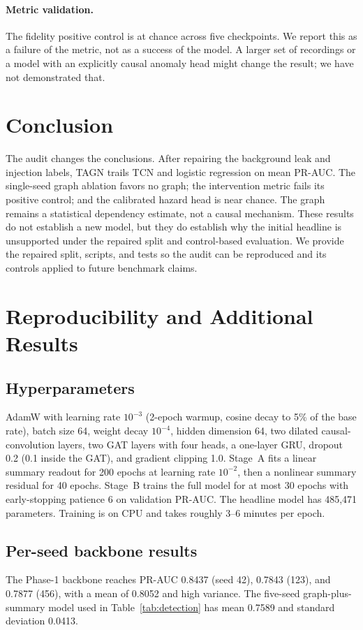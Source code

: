 \documentclass[conference]{IEEEtran}
\begin{document}
\paragraph{Metric validation.}
The fidelity positive control is at chance across five checkpoints. We report this as a failure of the metric, not as a success of the model. A larger set of recordings or a model with an explicitly causal anomaly head might change the result; we have not demonstrated that.

\section{Conclusion}

The audit changes the conclusions. After repairing the background leak and injection labels, TAGN trails TCN and logistic regression on mean PR-AUC. The single-seed graph ablation favors no graph; the intervention metric fails its positive control; and the calibrated hazard head is near chance. The graph remains a statistical dependency estimate, not a causal mechanism. These results do not establish a new model, but they do establish why the initial headline is unsupported under the repaired split and control-based evaluation. We provide the repaired split, scripts, and tests so the audit can be reproduced and its controls applied to future benchmark claims.

\appendix
\section{Reproducibility and Additional Results}

\subsection{Hyperparameters}
AdamW with learning rate $10^{-3}$ (2-epoch warmup, cosine decay to 5\% of the base rate), batch size 64, weight decay $10^{-4}$, hidden dimension 64, two dilated causal-convolution layers, two GAT layers with four heads, a one-layer GRU, dropout 0.2 (0.1 inside the GAT), and gradient clipping 1.0. Stage~A fits a linear summary readout for 200 epochs at learning rate $10^{-2}$, then a nonlinear summary residual for 40 epochs. Stage~B trains the full model for at most 30 epochs with early-stopping patience 6 on validation PR-AUC. The headline model has 485,471 parameters. Training is on CPU and takes roughly 3--6 minutes per epoch.

\subsection{Per-seed backbone results}
The Phase-1 backbone reaches PR-AUC 0.8437 (seed 42), 0.7843 (123), and 0.7877 (456), with a mean of 0.8052 and high variance. The five-seed graph-plus-summary model used in Table~\ref{tab:detection} has mean 0.7589 and standard deviation 0.0413.
\end{document}
